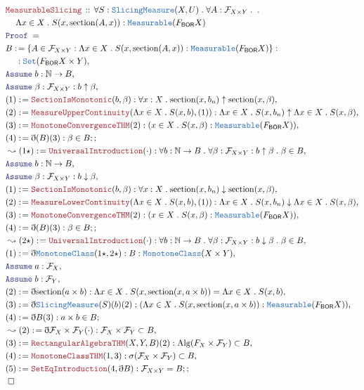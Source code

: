 \documentclass[12pt]{scrartcl}
\newcommand{\TYPE}[1]{\textcolor{NavyBlue}{\mathtt{#1}}}
\newcommand{\LOGIC}[1]{\textcolor{Blue}{\mathtt{#1}}}
\newcommand{\THM}[1]{\textcolor{Maroon}{\mathtt{#1}}}
\renewcommand{\.}{\; . \;}
\newcommand{\de}{: \kern 0.1pc =}
\newcommand{\Theorem}[2]{& \THM{#1} \, :: \, #2 \\ & \Proof = \\ }
\newcommand{\NewLine}{\\ & \kern 1pc}
\newcommand{\ForEach}[3]{\forall #1 : #2 \. #3 }
\newcommand{\Nat}{\mathbb{N} }
\newcommand{\Set}{\TYPE{Set}}
\newcommand{\Say}[3]{& #1 \de #2 : #3, \\}
\newcommand{\Conclude}[3]{& #1 \de #2 : #3; \\}
\newcommand{\Derive}[3]{& \leadsto #1 \de #2 : #3, \\}
\newcommand{\A}{\LOGIC{Assume} \;}
\newcommand{\Assume}[2]{& \A #1 : #2, \\}
\newcommand{\QED}{\; \square}
\newcommand{\EndProof}{& \QED \\}
\newcommand{\ByDef}{\eth}
\newcommand{\Proof}{\LOGIC{Proof} \; }
\newcommand{\BOR}{\mathsf{BOR}}
\newcommand{\F}{\mathcal{F}}
\begin{document}
 \begin{align*}
  \Theorem{MeasurableSlicing}{
 \ForEach{ S}{\TYPE{SlicingMeasure}(X,U)}{ 
 \ForEach{A}{ \F_{X \times Y} }{ \. \NewLine
   \Lambda x \in X \. S(x, \mathrm{section}(A,x)) : \TYPE{Measurable}(F_{\BOR}X)      
 }}}
 \Say{B}{ \{ A \in \F_{X \times Y} :  \Lambda x \in X \. S(x, \mathrm{section}(A,x)) : \TYPE{Measurable}(F_{\BOR}X)   \}}{
  \NewLine : 
 \Set (F_{\BOR}X \times Y)}
 \Assume{ b }{\Nat \to B}
 \Assume{ \beta }{ \F_{X \times Y} : b \uparrow \beta }
 \Say{(1)}{\THM{SectionIsMonotonic}(b,\beta)}
 {  \ForEach{x}{X}{  \mathrm{section}(x,b_n) \uparrow \mathrm{section}(x,\beta) }}
 \Say{(2)}{\THM{MeasureUpperContinuity}(\Lambda x \in X \. S(x,b),(1))}
 { \Lambda x \in X \. S(x, b_n) \uparrow \Lambda x \in X \. S(x, \beta)  }
 \Say{(3)}{\THM{MonotoneConvergenceTHM}(2)}
 { (x \in X \. S(x, \beta) : \TYPE{Measurable}(F_\BOR X) ) }
 \Conclude{(4)}{\ByDef(B)(3)}{ \beta \in B;}
 \Derive{(1\star)}{\THM{UniversalIntroduction}(\cdot)}
 {\ForEach{b}{  \Nat \to B}{\ForEach{\beta}{\F_{X \times Y} : b \uparrow \beta}}
 { \beta \in B } }
 \Assume{ b }{\Nat \to B}
 \Assume{ \beta }{ \F_{X \times Y} : b \downarrow \beta }
 \Say{(1)}{\THM{SectionIsMonotonic}(b,\beta)}
 {  \ForEach{x}{X}{  \mathrm{section}(x,b_n) \downarrow \mathrm{section}(x,\beta) }}
 \Say{(2)}{\THM{MeasureLowerContinuity}(\Lambda x \in X \. S(x,b),(1))}
 { \Lambda x \in X \. S(x, b_n) \downarrow \Lambda x \in X \. S(x, \beta)  }
 \Say{(3)}{\THM{MonotoneConvergenceTHM}(2)}
 { (x \in X \. S(x, \beta) : \TYPE{Measurable}(F_\BOR X) ) }
 \Conclude{(4)}{\ByDef(B)(3)}{ \beta \in B;}
 \Derive{(2\star)}{\THM{UniversalIntroduction}(\cdot)}
 {\ForEach{b}{  \Nat \to B}{\ForEach{\beta}{\F_{X \times Y} : b \downarrow \beta}}
 { \beta \in B } }
 \Say{(1)}{\ByDef\TYPE{MonotoneClass}(1\star,2\star)}
 { B : \TYPE{MonotoneClass}(X \times Y)}
 \Assume{a}{  \F_X}
 \Assume{b}{ \F_Y}
 \Say{(2)}{ \ByDef\mathrm{section}(a \times b) }
 { \Lambda x \in X \. S(x,\mathrm{section}(x,a \times b)) = \Lambda x \in X \. S(x,b)} 
 \Say{(3)}{ \ByDef\TYPE{SlicingMeasure}(S)(b)(2)}
 { ( \Lambda x \in X \. S(x,\mathrm{section}(x,a \times b)) : \TYPE{Measurable}( F_{\BOR}X) )}
 \Conclude{(4)}{\ByDef B (3)}{a \times b \in B}
 \Derive{(2)}{ \ByDef \F_X \times \F_Y(\cdot)}{\F_X \times \F_Y \subset B }
 \Say{(3)}{\THM{RectangularAlgebraTHM}(X,Y,B)(2)}{\mathrm{Alg}(F_X \times \F_Y) \subset B}
 \Say{(4)}{\THM{MonotoneClassTHM}(1,3)}{\sigma(\F_X \times \F_Y) \subset B}
 \Conclude{(5)}{\THM{SetEqIntroduction}(4,\ByDef B)}{ \F_{X \times Y} = B ;}
 \EndProof 
 \end{align*}
\end{document}
